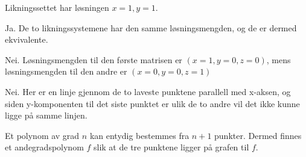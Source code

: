\documentclass[11pt, a4paper, norsk]{NTNUoving}
\begin{document}
\begin{oppgave}[1]
    
    Likningssettet har løsningen $x=1, y=1$.
    
\end{oppgave}

\begin{oppgave}[2]
    Ja. De to likningssystemene har den samme løsningsmengden, og de er dermed ekvivalente.
\end{oppgave}

\begin{oppgave}[3]
    Nei. Løsningsmengden til den første matrisen er $(x=1, y=0, z=0)$, mens løsningsmengden til den andre er $(x=0, y=0, z=1)$
\end{oppgave}

\begin{oppgave}[4]
    \begin{punkt}
        Nei. Her er en linje gjennom de to laveste punktene parallell med x-aksen, og siden y-komponenten til det siste punktet er ulik de to andre vil det ikke kunne ligge på samme linjen. 
    \end{punkt}
    
    \begin{punkt}
        Et polynom av grad $n$ kan entydig bestemmes fra $n+1$ punkter. Dermed finnes et andegradspolynom $f$ slik at de tre punktene ligger på  grafen til $f$. 
    \end{punkt}
\end{oppgave}
\end{document}

